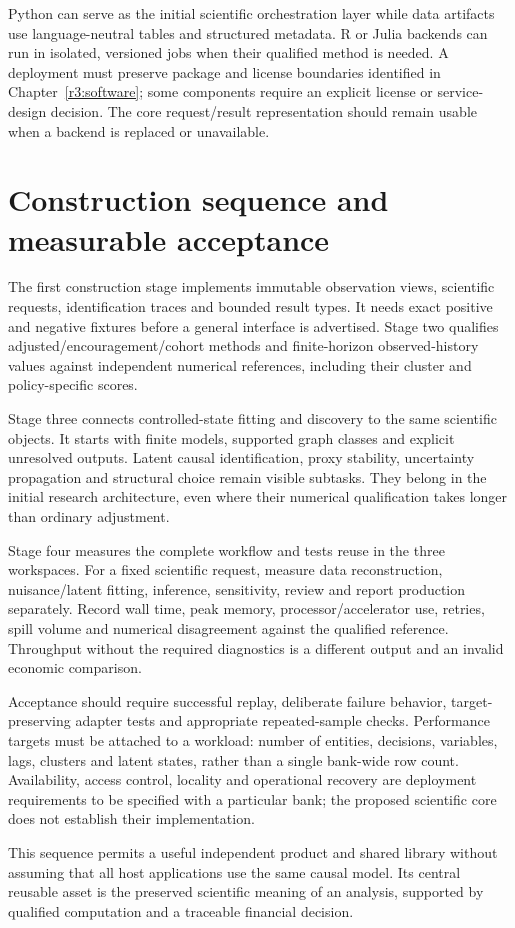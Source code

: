 Python can serve as the initial scientific orchestration layer while
data artifacts use language-neutral tables and structured metadata.
R or Julia backends can run in isolated, versioned jobs when their
qualified method is needed. A deployment must preserve package and
license boundaries identified in Chapter~\ref{r3:software}; some
components require an explicit license or service-design decision.
The core request/result representation should remain usable when a
backend is replaced or unavailable.

\section{Construction sequence and measurable acceptance}
\label{r3:construction-sequence}

The first construction stage implements immutable observation views,
scientific requests, identification traces and bounded result types.
It needs exact positive and negative fixtures before a general interface
is advertised. Stage two qualifies adjusted/encouragement/cohort methods
and finite-horizon observed-history values against independent numerical
references, including their cluster and policy-specific scores.

Stage three connects controlled-state fitting and discovery to the same
scientific objects. It starts with finite models, supported graph classes
and explicit unresolved outputs. Latent causal identification, proxy
stability, uncertainty propagation and structural choice remain visible
subtasks. They belong in the initial research architecture, even where
their numerical qualification takes longer than ordinary adjustment.

Stage four measures the complete workflow and tests reuse in the three
workspaces. For a fixed scientific request, measure data reconstruction,
nuisance/latent fitting, inference, sensitivity, review and report
production separately. Record wall time, peak memory, processor/accelerator
use, retries, spill volume and numerical disagreement against the
qualified reference. Throughput without the required diagnostics is a
different output and an invalid economic comparison.

Acceptance should require successful replay, deliberate failure behavior,
target-preserving adapter tests and appropriate repeated-sample checks.
Performance targets must be attached to a workload: number of entities,
decisions, variables, lags, clusters and latent states, rather than a
single bank-wide row count. Availability, access control, locality and
operational recovery are deployment requirements to be specified with a
particular bank; the proposed scientific core does not establish their
implementation.

This sequence permits a useful independent product and shared library
without assuming that all host applications use the same causal model.
Its central reusable asset is the preserved scientific meaning of an
analysis, supported by qualified computation and a traceable financial
decision.




